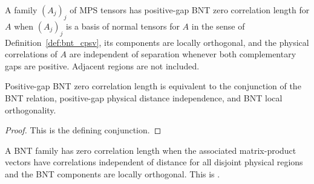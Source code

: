 \begin{definition}%
    \label{def:is_positive_gap_bnt_zcl}
    \leanok
    A family $(A_j)_j$ of MPS tensors has positive-gap BNT zero correlation
    length for $A$ when $(A_j)_j$ is a basis of normal tensors for $A$ in the
    sense of Definition~\ref{def:bnt_cpsv}, its components are locally
    orthogonal, and the physical correlations of $A$ are independent of
    separation whenever both complementary gaps are positive. Adjacent regions
    are not included.
\end{definition}

\begin{lemma}%
    \label{lem:is_positive_gap_bnt_zcl_iff}
    \leanok
    Positive-gap BNT zero correlation length is equivalent to the conjunction
    of the BNT relation, positive-gap physical distance independence, and BNT
    local orthogonality.
\end{lemma}
\begin{proof}\leanok
    This is the defining conjunction.
\end{proof}

\begin{definition}%
    \label{def:source_bnt_zcl}
    \leanok
    A BNT family has zero correlation length when the associated matrix-product
    vectors have correlations independent of distance for all disjoint physical
    regions and the BNT components are locally orthogonal.  This is
    \cite[Definition~3.6]{Cirac2016MPDO_arXiv}.
\end{definition}

